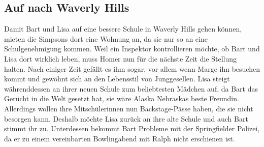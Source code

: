 \subsection{Auf nach Waverly Hills}
Damit Bart und Lisa auf eine bessere Schule in Waverly Hills gehen können, mieten die Simpsons dort eine Wohnung an, da sie nur so an eine Schulgenehmigung kommen. Weil ein Inspektor kontrollieren möchte, ob Bart und Lisa dort wirklich leben, muss Homer nun für die nächste Zeit die Stellung halten. Nach einiger Zeit gefällt es ihm sogar, vor allem wenn Marge ihn besuchen kommt und gewöhnt sich an den Lebensstil von Junggesellen. Lisa steigt währenddessen an ihrer neuen Schule zum beliebtesten Mädchen auf, da Bart das Gerücht in die Welt gesetzt hat, sie wäre Alaska Nebraskas beste Freundin. Allerdings wollen ihre Mitschülerinnen nun Backstage-Pässe haben, die sie nicht besorgen kann. Deshalb möchte Lisa zurück an ihre alte Schule und auch Bart stimmt ihr zu. Unterdessen bekommt Bart Probleme mit der Springfielder Polizei, da er zu einem vereinbarten Bowlingabend mit Ralph nicht erschienen ist.


